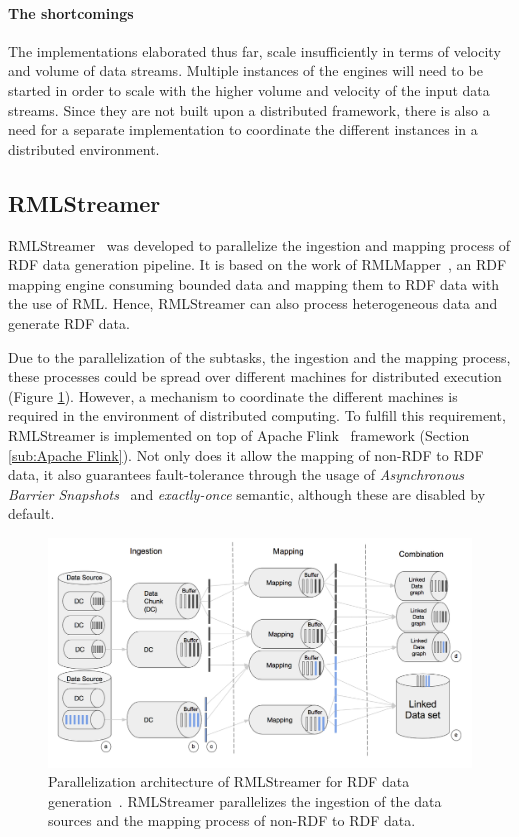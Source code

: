 \paragraph{The shortcomings}%
The implementations elaborated thus far, scale insufficiently in terms of velocity and 
volume of data streams. Multiple instances of the engines will need to 
be started in order to scale with the higher volume and velocity of 
the input data streams. Since they are not built upon a distributed framework, 
there is also a need for a separate implementation to coordinate the different 
instances in a distributed environment. 

\subsection{RMLStreamer}
\label{sec:rml_streamer}
RMLStreamer~\cite{rml_streamer}
was developed to parallelize the ingestion and mapping process of RDF data generation pipeline. 
It is based on the work of RMLMapper~\cite{rml}, an RDF mapping engine consuming bounded data and 
mapping them to RDF data with the use of RML. Hence, RMLStreamer can also 
process heterogeneous data and generate RDF data. 

Due to the parallelization of the subtasks, the ingestion and the mapping process, these processes
could be spread over different machines for distributed execution (Figure \ref{fig:rml-parallel-arch}). 
However, a mechanism to coordinate the different machines is required in the environment of 
distributed computing.  
To fulfill this requirement, RMLStreamer is 
implemented on top of Apache Flink~\cite{flink} framework (Section \ref{sub:Apache Flink}). Not only does it allow the mapping 
of non-RDF to RDF data, it also guarantees fault-tolerance through the usage of 
\emph{Asynchronous Barrier Snapshots}~\cite{flink_fault_tolerance} and \emph{exactly-once} semantic,
although these are disabled by default. 

\begin{figure}[!htbp]
  \centering
  \includegraphics[width=\textwidth]{fig/rml_streamer_arch.png}
  \caption[Parallelization architecture of RMLStreamer for RDF data generation~\cite{rml_streamer}]
  {Parallelization architecture of RMLStreamer for RDF data generation~\cite{rml_streamer}.
      RMLStreamer parallelizes 
  the ingestion of the data sources and the mapping process of non-RDF to RDF data. }
  \label{fig:rml-parallel-arch}
\end{figure}



